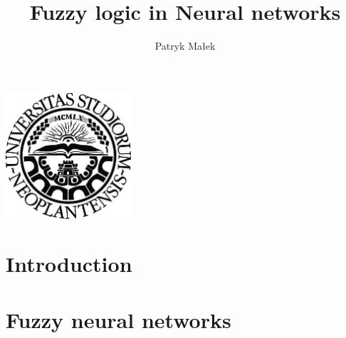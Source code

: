 \documentclass[a4paper,11pt]{article}
\newcommand{\mahtitle}{Fuzzy logic in Neural networks}
\begin{document}
\label{Title} 
\title{\mahtitle \vspace{1pc}}
\author{Patryk Małek \vspace{-0.7pc}}
\date{}%
\maketitle
\thispagestyle{empty}


\vspace{5pc}
\centerline{
\includegraphics[width=0.35\textwidth,height=0.35\textheight,keepaspectratio]{NoviSadLogoGray.jpg}
}
\vspace{11pc}

\begin{abstract}
\label{Abstract}

\end{abstract}




\pagebreak
\section{Introduction} 



\section{Fuzzy neural networks}
\end{document}
